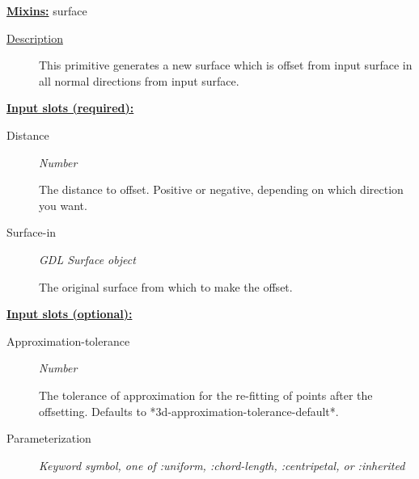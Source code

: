 \documentclass [11pt]{book}
\begin{document}
\begin{itemize}
\textbf{
\underline{Mixins:}} surface





\begin{description}

\item [
\underline{Description}]


This primitive generates a new surface
  which is offset from input surface in all normal directions from input surface.



\end{description}








\textbf{
\underline{Input slots (required):}}

\begin{description}

\item [Distance]
\emph{Number}

 The distance to offset. Positive or negative, depending on which direction you want.




\item [Surface-in]
\emph{GDL Surface object}

 The original surface from which to make the offset.




\end{description}






\textbf{
\underline{Input slots (optional):}}

\begin{description}

\item [Approximation-tolerance]
\emph{Number}

 The tolerance of approximation for the re-fitting of points after the offsetting.
Defaults to *3d-approximation-tolerance-default*.




\item [Parameterization]
\emph{Keyword symbol, one of :uniform, :chord-length, :centripetal, or :inherited}


\end{description}
\end{itemize}
\end{document}
